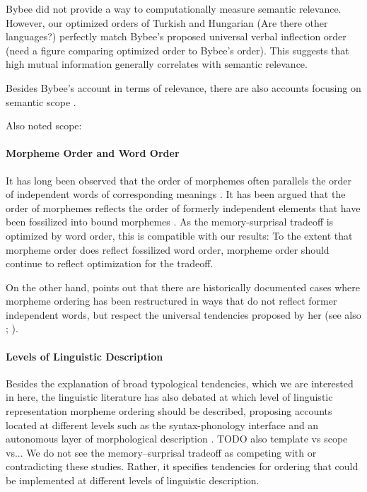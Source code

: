 \documentclass[11pt,letterpaper]{article}
\newcommand\becky[1]{{\color{blue}(#1)}}
\begin{document}
Bybee did not provide a way to computationally measure semantic relevance. However, our optimized orders of Turkish and Hungarian \becky{Are there other languages?} perfectly match Bybee's proposed universal verbal inflection order \becky{need a figure comparing optimized order to Bybee's order}. This suggests that high mutual information generally correlates with semantic relevance. 

Besides Bybee's account in terms of relevance, there are also accounts focusing on semantic scope \citep{rice2000morpheme}.

Also noted scope: \citep{baker1988incorporation,foley1984functional,chierchia1990meaning,valin1992a}



\paragraph{Morpheme Order and Word Order}
It has long been observed that the order of morphemes often parallels the order of independent words of corresponding meanings \citep{givon1971historical,venneman1973explanation,baker1985the}.
It has been argued that the order of morphemes reflects the order of formerly independent elements that have been fossilized into bound morphemes \citet{givon1971historical,venneman1973explanation}.
As the memory-surprisal tradeoff is optimized by word order, this is compatible with our results:
To the extent that morpheme order does reflect fossilized word order, morpheme order should continue to reflect optimization for the tradeoff.

On the other hand, \citet{bybee-morphology-1985} points out that there are historically documented cases where morpheme ordering has been restructured in ways that do not reflect former independent words, but respect the universal tendencies proposed by her (see also \citet{mithun2000the, haspelmath1993the, mithun1995affixation}; \citet[Section 15]{rice2000morpheme}).


\paragraph{Levels of Linguistic Description}
Besides the explanation of broad typological tendencies, which we are interested in here, the linguistic literature has also debated at which level of linguistic representation morpheme ordering should be described, proposing accounts located at different levels such as the syntax-phonology interface \citep{baker1985the} and an autonomous layer of morphological description \citep{hyman2003suffix}.
TODO also template vs scope vs...
We do not see the memory--surprisal tradeoff as competing with or contradicting these studies.
Rather, it specifies tendencies for ordering that could be implemented at different levels of linguistic description.
\end{document}
